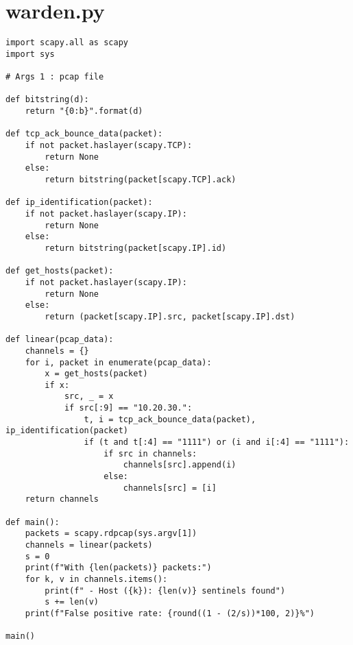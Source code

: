 \section{warden.py}
\label{sec:warden_py}

\begin{listing}[H]
    \vspace{0.5cm}
    \begin{verbatim}
import scapy.all as scapy
import sys

# Args 1 : pcap file

def bitstring(d):
    return "{0:b}".format(d)

def tcp_ack_bounce_data(packet):
    if not packet.haslayer(scapy.TCP):
        return None
    else:
        return bitstring(packet[scapy.TCP].ack)

def ip_identification(packet):
    if not packet.haslayer(scapy.IP):
        return None
    else:
        return bitstring(packet[scapy.IP].id)

def get_hosts(packet):
    if not packet.haslayer(scapy.IP):
        return None
    else:
        return (packet[scapy.IP].src, packet[scapy.IP].dst)

def linear(pcap_data):
    channels = {}
    for i, packet in enumerate(pcap_data):
        x = get_hosts(packet)
        if x:
            src, _ = x
            if src[:9] == "10.20.30.":
                t, i = tcp_ack_bounce_data(packet), ip_identification(packet)
                if (t and t[:4] == "1111") or (i and i[:4] == "1111"):
                    if src in channels:
                        channels[src].append(i)
                    else:
                        channels[src] = [i]
    return channels

def main():
    packets = scapy.rdpcap(sys.argv[1])
    channels = linear(packets)
    s = 0
    print(f"With {len(packets)} packets:")
    for k, v in channels.items():
        print(f" - Host ({k}): {len(v)} sentinels found")
        s += len(v)
    print(f"False positive rate: {round((1 - (2/s))*100, 2)}%")

main()
    \end{verbatim}
\end{listing}